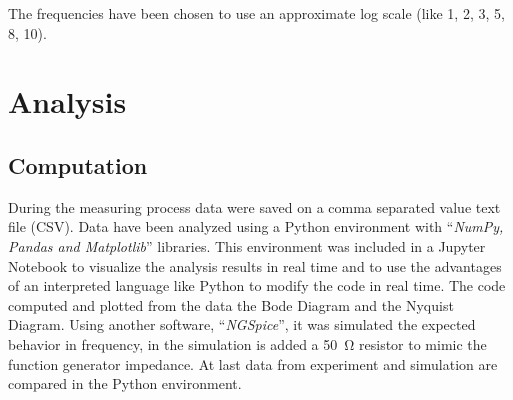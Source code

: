 \documentclass[a4paper, twocolumn]{article}
\begin{document}
The frequencies have been chosen to use an approximate log scale (like 1, 2, 3, 5, 8, 10). 

\section{Analysis}

\subsection{Computation}

During the measuring process data were saved on a comma separated value text file (CSV). Data have been analyzed using a Python environment with ``\emph{NumPy, Pandas and Matplotlib}'' libraries. This environment was included in a Jupyter Notebook to visualize the analysis results in real time and to use the advantages of an interpreted language like Python to modify the code in real time. The code computed and plotted from the data the Bode Diagram and the Nyquist Diagram. Using another software, ``\emph{NGSpice}'', it was simulated the expected behavior in frequency, in the simulation is added a \SI{50}{\ohm} resistor to mimic the function generator impedance. At last data from experiment and simulation are compared in the Python environment.
    
\end{document}
